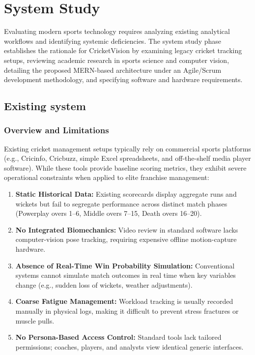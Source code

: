 \documentclass[12pt,a4paper]{report}
\begin{document}
\clearpage

\chapter{System Study}

Evaluating modern sports technology requires analyzing existing analytical workflows and identifying systemic deficiencies. The system study phase establishes the rationale for CricketVision by examining legacy cricket tracking setups, reviewing academic research in sports science and computer vision, detailing the proposed MERN-based architecture under an Agile/Scrum development methodology, and specifying software and hardware requirements.

\section{Existing system}

\subsection{Overview and Limitations}
Existing cricket management setups typically rely on commercial sports platforms (e.g., Cricinfo, Cricbuzz, simple Excel spreadsheets, and off-the-shelf media player software). While these tools provide baseline scoring metrics, they exhibit severe operational constraints when applied to elite franchise management:

\begin{enumerate}
    \item \textbf{Static Historical Data:} Existing scorecards display aggregate runs and wickets but fail to segregate performance across distinct match phases (Powerplay overs 1–6, Middle overs 7–15, Death overs 16–20).
    \item \textbf{No Integrated Biomechanics:} Video review in standard software lacks computer-vision pose tracking, requiring expensive offline motion-capture hardware.
    \item \textbf{Absence of Real-Time Win Probability Simulation:} Conventional systems cannot simulate match outcomes in real time when key variables change (e.g., sudden loss of wickets, weather adjustments).
    \item \textbf{Coarse Fatigue Management:} Workload tracking is usually recorded manually in physical logs, making it difficult to prevent stress fractures or muscle pulls.
    \item \textbf{No Persona-Based Access Control:} Standard tools lack tailored permissions; coaches, players, and analysts view identical generic interfaces.
\end{enumerate}
\end{document}
